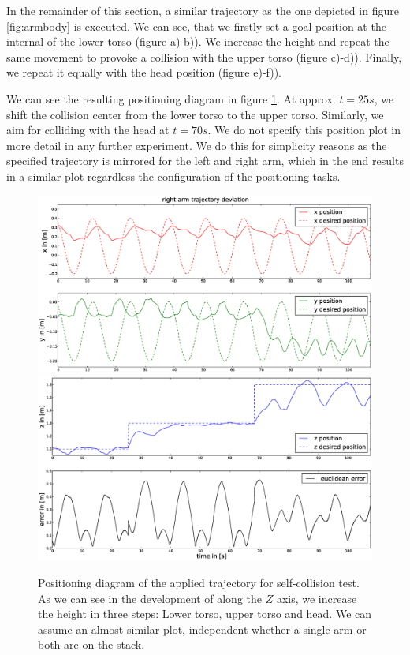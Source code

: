 \newpage
In the remainder of this section, a similar trajectory as the one depicted in figure \ref{fig:armbody} is executed. We can see, that we firstly set a goal position at the internal of the lower torso (figure a)-b)). We increase the height and repeat the same movement to provoke a collision with the upper torso (figure c)-d)). Finally, we repeat it equally with the head position (figure e)-f)). 

We can see the resulting positioning diagram in figure \ref{fig:selfcollisionposition}. At approx. $t=25s$, we shift the collision center from the lower torso to the upper torso. Similarly, we aim for colliding with the head at $t=70s$. We do not specify this position plot in more detail in any further experiment. We do this for simplicity reasons as the specified trajectory is mirrored for the left and right arm, which in the end results in a similar plot regardless the configuration of the positioning tasks.
\begin{figure}[h!]
  \centering 
     \includegraphics[width=\textwidth]{../figures/arm_body/position1.eps}
     \includegraphics[width=\textwidth]{../figures/arm_body/position2.eps}
    \caption{Positioning diagram of the applied trajectory for self-collision test. As we can see in the development of along the $Z$ axis, we increase the height in three steps: Lower torso, upper torso and head. We can assume an almost similar plot, independent whether a single arm or both are on the stack.}
    \label{fig:selfcollisionposition}
\end{figure}

